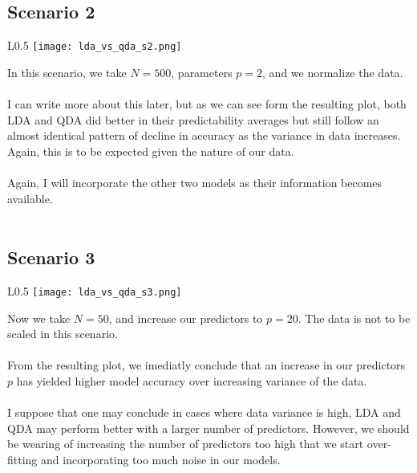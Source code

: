 \documentclass[11pt, oneside]{article}
\begin{document}
\subsection*{Scenario 2}
\begin{wrapfigure}[]{L}{0.5\textwidth}
\vspace{-0.55cm}
\texttt{[image: lda\_vs\_qda\_s2.png]}
\vspace{-.55cm}
\end{wrapfigure}
In this scenario, we take $N=500$, parameters $p=2$, and we normalize the data.\\
\\
I can write more about this later, but as we can see form the resulting plot, both LDA and QDA did better in their predictability averages but still follow an almost identical pattern of decline in accuracy as the variance in data increases. Again, this is to be expected given the nature of our data.\\
\\
Again, I will incorporate the other two models as their information becomes available.\\
\\



\subsection*{Scenario 3}
\begin{wrapfigure}[]{L}{0.5\textwidth}
\vspace{-0.55cm}
\texttt{[image: lda\_vs\_qda\_s3.png]}
\vspace{-.55cm}
\end{wrapfigure}

Now we take $N=50$, and increase our predictors to $p=20$. The data is not to be scaled in this scenario.\\
\\
From the resulting plot, we imediatly conclude that an increase in our predictors $p$ has yielded higher model accuracy over increasing variance of the data.\\
\\
I suppose that one may conclude in cases where data variance is high, LDA and QDA may perform better with a larger number of predictors. However, we should be wearing of increasing the number of predictors too high that we start over-fitting and incorporating too much noise in our models.\\
\\
\end{document}
